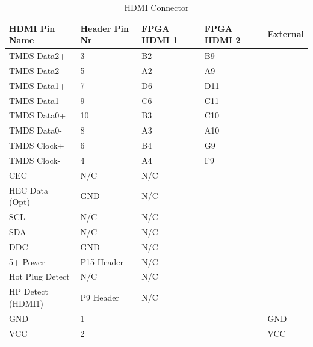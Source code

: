 \begin{table}[]
    \centering
    \label{HDMI Connector}
    \begin{tabular}{lllll}
        HDMI Pin Name            & Header Pin Nr & FPGA HDMI 1 & FPGA HDMI 2 & External \\
        \hline
        TMDS Data2+              & 3             & B2              & B9              &          \\
        TMDS Data2-              & 5             & A2              & A9              &          \\
        TMDS Data1+              & 7             & D6              & D11             &          \\
        TMDS Data1-              & 9             & C6              & C11             &          \\
        TMDS Data0+              & 10            & B3              & C10             &          \\
        TMDS Data0-              & 8             & A3              & A10             &          \\
        TMDS Clock+              & 6             & B4              & G9              &          \\
        TMDS Clock-              & 4             & A4              & F9              &          \\
        CEC                      & N/C           & N/C             &                 &          \\
        HEC Data (Opt)           & GND           & N/C             &                 &          \\
        SCL                      & N/C           & N/C             &                 &          \\
        SDA                      & N/C           & N/C             &                 &          \\
        DDC                      & GND           & N/C             &                 &          \\
        5+ Power                 & P15 Header    & N/C             &                 &          \\
        Hot Plug Detect          & N/C           & N/C             &                 &          \\
        HP Detect (HDMI1) & P9 Header     & N/C             &                 &          \\
        GND & 1             &                 &                 & GND      \\
        VCC & 2             &                 &                 & VCC      \\
    \end{tabular}
    \caption{HDMI Connector}
\end{table}

